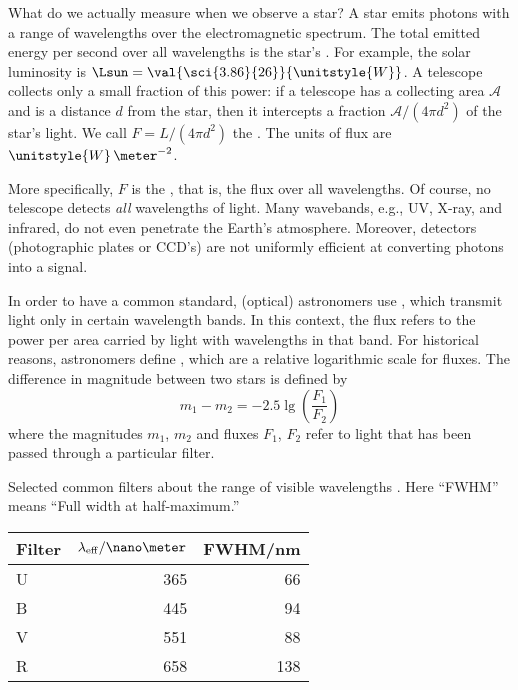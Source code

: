 
What do we actually measure when we observe a star? A star emits photons with a range of wavelengths over the electromagnetic spectrum.  The total emitted energy per second over all wavelengths is the star's .  For example, the solar luminosity is $\Lsun = \val{\sci{3.86}{26}}{\unitstyle{W}}$.  A telescope collects only a small fraction of this power: if a telescope has a collecting area $\mathcal{A}$ and is a distance $d$ from the star, then it intercepts a fraction $\mathcal{A}/(4\pi d^{2})$ of the star's light.  We call $F = L/(4\pi d^{2})$ the . The units of flux are $\unitstyle{W}\,\meter^{-2}$.

More specifically, $F$ is the , that is, the flux over all wavelengths.  Of course, no telescope detects \emph{all} wavelengths of light. Many wavebands, e.g., UV, X-ray, and infrared, do not even penetrate the Earth's atmosphere.  Moreover, detectors (photographic plates or CCD's) are not uniformly efficient at converting photons into a signal.

In order to have a common standard, (optical) astronomers use , which transmit light only in certain wavelength bands. In this context, the flux refers to the power per area carried by light with wavelengths in that band.  For historical reasons, astronomers define , which are a relative logarithmic scale for fluxes.  The difference in magnitude between two stars is defined by
\begin{equation}\label{e.magnitude-def}
	m_{1} - m_{2} = -2.5\lg\left(\frac{F_{1}}{F_{2}}\right)
\end{equation}
where the magnitudes $m_{1}$, $m_{2}$ and fluxes $F_{1}$, $F_{2}$ refer to light that has been passed through a particular filter.

\begin{margintable}
\label{t.ubvr}\caption{Selected common filters about the range of visible wavelengths \citep{Binney1998Galactic-Astron}.  Here ``FWHM'' means ``Full width at half-maximum.''}
\begin{tabular}{lrr}
\hline
Filter & $\lambda_{\mathrm{eff}}/\nano\meter$ & FWHM/nm \\
\hline\hline
U & 365 &  66\\
B & 445 &  94\\
V & 551 &  88\\
R & 658 & 138\\
\hline
\end{tabular}
\end{margintable}

